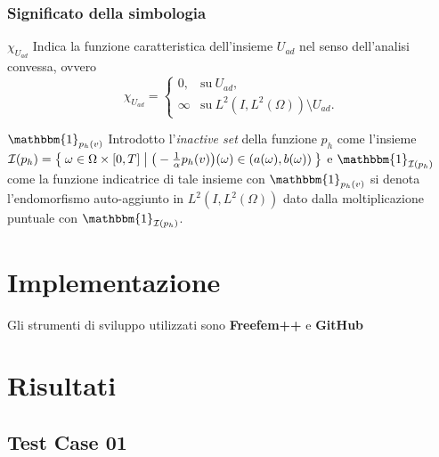 \documentclass{beamer}
\theoremstyle{definition}
\theoremstyle{remark}
\theoremstyle{plain}
\theoremstyle{definition}
\begin{document}
\begin{frame}
\frametitle{Significato della simbologia}
\begin{block}{$ \chi_{U_{ad}} $}
Indica la funzione caratteristica dell'insieme $ U_{ad} $ nel senso dell'analisi convessa, ovvero
\begin{equation}
\chi_{U_{ad}}=
\begin{cases}
0,        &\text{su} \ U_{ad},\\
\infty   &\text{su} \ L^2(I,L^2(\Omega))\setminus U_{ad}.
\end{cases}
\end{equation}
\end{block}
\begin{block}{$ \mathbbm{1}_{p_h(v)} $}
Introdotto l'\textit{inactive set} della funzione $ p_h $ come l'insieme $ \mathcal{I}(p_h)=\Set{\omega\in \Omega\times [0,T] | \big( -\frac{1}{\alpha}p_h(v)\big)(\omega)\in (a(\omega),b(\omega))} $ e $ \mathbbm{1}_{\mathcal{I}(p_h)} $ come la funzione indicatrice di tale insieme
con $ \mathbbm{1}_{p_h(v)} $ si denota l'endomorfismo auto-aggiunto in $ L^2(I,L^2(\Omega)) $ dato dalla moltiplicazione puntuale con $ \mathbbm{1}_{\mathcal{I}(p_h)} $. 
\end{block}

\end{frame}


\section{Implementazione}
\begin{frame}
Gli strumenti di sviluppo utilizzati sono \textbf{Freefem++} e \textbf{GitHub}




\end{frame}

\section{Risultati}
\subsection{Test Case 01}
\end{document}
